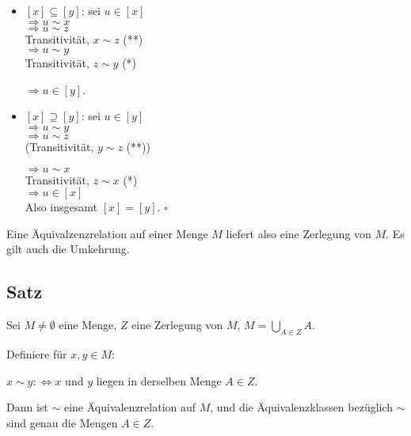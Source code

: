 \documentclass[a4paper, 12pt, twoside] {article}
\begin{document}
\begin{itemize}
\item $[x] \subseteq [y]$: sei $u \in [x]$ \\
$\Rightarrow u \sim x$ \\
$\Rightarrow u \sim z$ \\
Transitivität, $x \sim z$ (**) \\
$\Rightarrow u \sim y$ \\
Transitivität, $z \sim y$ (*)

$\Rightarrow u \in [y]$.

\item $[x] \supseteq [y]$: sei $u \in [y]$ \\
$\Rightarrow u \sim y$ \\
$\Rightarrow u \sim z$ \\
(Transitivität, $y \sim z$ (**))

$\Rightarrow u \sim x$ \\
Transitivität, $z \sim x$ (*) \\
$\Rightarrow u \in [x]$ \\
Also insgesamt $[x] = [y]$. \hfill $\square$

\end{itemize}


Eine Äquivalzenzrelation auf einer Menge $M$ liefert also eine Zerlegung von $M$. Es gilt auch die Umkehrung.

\subsection{Satz} Sei $M \neq \emptyset$ eine Menge, $Z$ eine Zerlegung von $M$, $M= \displaystyle\bigcup_{A \in Z} A$.

Definiere für $x,y \in M$:

$x \sim y :\Leftrightarrow x$ und $y$ liegen in derselben Menge $A \in Z$.

Dann ist $\sim$ eine Äquivalenzrelation auf $M$, und die Äquivalenzklassen bezüglich $\sim$ sind genau die Mengen $A \in Z$.

\end{document}
